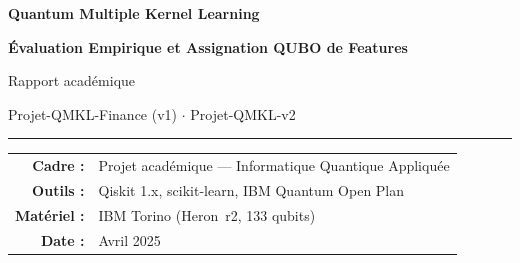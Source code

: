 \documentclass[12pt,a4paper]{article}
\begin{document}
\begin{titlepage}
\centering
\vspace*{3cm}

{\Huge\bfseries Quantum Multiple Kernel Learning\par}
\vspace{0.8cm}
{\Large\bfseries Évaluation Empirique et Assignation QUBO de Features\par}
\vspace{2cm}

{\large Rapport académique\par}
\vspace{0.5cm}
{\normalsize Projet-QMKL-Finance (v1) $\cdot$ Projet-QMKL-v2\par}

\vspace{2.5cm}
\rule{0.6\textwidth}{0.4pt}
\vspace{1cm}

\begin{tabular}{rl}
\textbf{Cadre :}    & Projet académique — Informatique Quantique Appliquée \\[4pt]
\textbf{Outils :}   & Qiskit 1.x, scikit-learn, IBM Quantum Open Plan \\[4pt]
\textbf{Matériel :} & IBM Torino (Heron~r2, 133 qubits) \\[4pt]
\textbf{Date :}     & Avril 2025 \\
\end{tabular}

\vspace{2cm}

\begin{minipage}{0.85\textwidth}
\begin{abstract}
\noindent
Ce rapport présente deux projets successifs explorant le
\emph{Quantum Multiple Kernel Learning} (QMKL).
Le premier projet (QMKL-Finance, v1) conduit une évaluation empirique
systématique de douze noyaux quantiques combinés selon cinq stratégies MKL,
sur trois jeux de données incluant des données financières (German Credit,
Bank Marketing) et un benchmark médical (Breast Cancer).
Le second (QMKL-v2) propose une formulation QUBO originale permettant
d'assigner optimalement des features à des noyaux quantiques et fournit une
preuve de concept sur Breast Cancer, avec IBM Torino comme banc d'essai hardware.
L'extension aux données macroéconomiques FRED reste une perspective future.
Les résultats, bien que mitigés vis-à-vis des classifieurs classiques,
permettent de documenter avec précision les phénomènes limitants —
notamment les \emph{barren plateaus} — et de délimiter les régimes pour
lesquels l'approche quantique devient pertinente.
\end{abstract}
\end{minipage}

\vfill
\end{titlepage}
\end{document}
